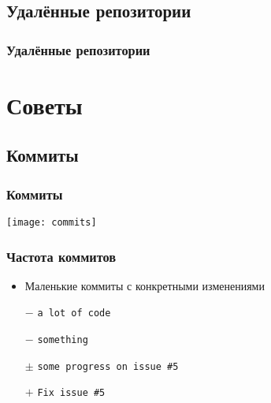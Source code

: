 \documentclass[pdf,russian]{beamer}
\begin{document}
\subsection{Удалённые репозитории}
\begin{frame}[fragile]
    \frametitle{Удалённые репозитории}
\end{frame}

\section{Советы}

\subsection{Коммиты}

\begin{frame}
    \frametitle{Коммиты}
    \pause
    \center
    \texttt{[image: commits]}
\end{frame}

\begin{frame}
    \frametitle{Частота коммитов}
    \begin{itemize}
        \item Маленькие коммиты с конкретными изменениями
        \pause
        \item[$-$] \texttt{a lot of code}
        \pause
        \item[$-$] \texttt{something}
        \pause
        \item[$\pm$] \texttt{some progress on issue \#{}5}
        \pause
        \item[$+$] \texttt{Fix issue \#{}5}
    \end{itemize}
\end{frame}
\end{document}
